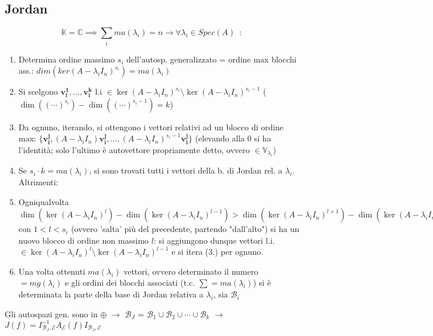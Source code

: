 \documentclass[10pt]{article}
\theoremstyle{plain}
\begin{document}
\subsection*{Jordan}
\[\mathbb{K} = \mathbb{C} \implies \sum_i ma(\lambda_i) = n \rightarrow \forall \lambda_i \in Spec(A) \enspace : \]
\begin{enumerate}
    \item Determina ordine massimo $s_i$ dell'autosp. generalizzato = ordine max blocchi ass.: $dim(ker(A - \lambda_i I_n)^{s_i}) = ma(\lambda_i)$
    \item Si scelgono $\mathbf{v_i^1}, ... , \mathbf{v_i^k}$ l.i $\in \ker(A - \lambda_i I_n)^{s_i} \setminus \ker(A - \lambda_i I_n)^{s_i-1}$ ($\dim((\cdots)^{s_i}) - \dim((\cdots)^{s_i-1}) = k$)
    \item Da ognuno, iterando, si ottengono i vettori relativi ad un blocco di ordine max: $\{\mathbf{v_i^j}, (A - \lambda_i I_n)\mathbf{v_i^j}, ... , (A - \lambda_i I_n)^{s_i - 1}\mathbf{v_i^j}\}$ (elevando alla 0 si ha l'identità; solo l'ultimo è autovettore propriamente detto, ovvero $\in \mathbb{V}_{\lambda_i}$)
    \item Se $s_i \cdot k = ma(\lambda_i)$, si sono trovati tutti i vettori della b. di Jordan rel. a $\lambda_i$. Altrimenti:
    \item Ogniqualvolta $\dim (\ker(A - \lambda_i I_n)^{l}) - \dim (\ker(A - \lambda_i I_n)^{l-1}) > \dim (\ker(A - \lambda_i I_n)^{l+1}) - \dim (\ker(A - \lambda_i I_n)^{l})$ con $1 < l < s_i$ (ovvero 'salta' più del precedente, partendo "dall'alto") si ha un nuovo blocco di ordine non massimo $l$: si aggiungono dunque 
    vettori l.i. $\in \ker(A - \lambda_i I_n)^{l} \setminus \ker(A - \lambda_i I_n)^{l-1}$ e si itera (3.) per ognuno.
    \item Una volta ottenuti $ma(\lambda_i)$ vettori, ovvero determinato il numero $ = mg(\lambda_i)$ e gli ordini dei blocchi associati (t.c. $\sum = ma(\lambda_i)$) si è determinata la parte della base di Jordan relativa a $\lambda_i$, sia $\mathcal{B}_i$
\end{enumerate}
Gli autospazi gen. sono in $\oplus$ $\rightarrow$ $\mathcal{B}_J$ = $\mathcal{B}_1 \cup \mathcal{B}_2 \cup \cdots \cup \mathcal{B}_k$ $\rightarrow$ $J(f) = I_{\mathcal{B}_J , \mathcal{E}}^{-1}A_{\mathcal{E}}(f) I_{\mathcal{B}_J , \mathcal{E}}$
\end{document}
